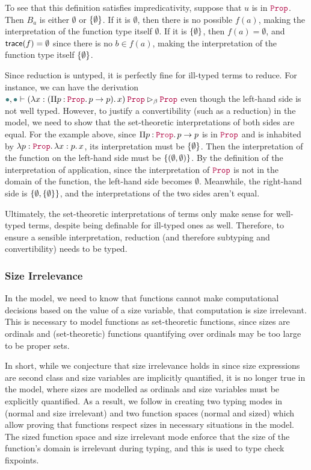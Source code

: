 To see that this definition satisfies impredicativity,
suppose that $u$ is in $\Prop$.
Then $B_a$ is either $\emptyset$ or $\{\emptyset\}$.
If it is $\emptyset$, then there is no possible $f(a)$,
making the interpretation of the function type itself $\emptyset$.
If it is $\{\emptyset\}$, then $f(a) = \emptyset$,
and $\textsf{trace}(f) = \emptyset$ since there is no $b \in f(a)$,
making the interpretation of the function type itself $\{\emptyset\}$.

Since reduction is untyped, it is perfectly fine for ill-typed terms to reduce.
For instance, we can have the derivation
$\mt, \mt \vdash \app{(\abs{x}{(\prod{p}{\Prop}{p \to p})}{x})}{\Prop} \rhd_\beta \Prop$
even though the left-hand side is not well typed.
However, to justify a convertibility (such as a reduction) in the model,
we need to show that the set-theoretic interpretations of both sides are equal.
For the example above, since $\prod{p}{\Prop}{p \to p}$ is in $\Prop$
and is inhabited by $\abs{p}{\Prop}{\abs{x}{p}{x}}$,
its interpretation must be $\{\emptyset\}$.
Then the interpretation of the function on the left-hand side must be $\{(\emptyset, \emptyset)\}$.
By the definition of the interpretation of application,
since the interpretation of $\Prop$ is not in the domain of the function,
the left-hand side becomes $\emptyset$.
Meanwhile, the right-hand side is $\{\emptyset, \{\emptyset\}\}$,
and the interpretations of the two sides aren't equal.

Ultimately, the set-theoretic interpretations of terms only make sense for well-typed terms,
despite being definable for ill-typed ones as well.
Therefore, to ensure a sensible interpretation,
reduction (and therefore subtyping and convertibility) needs to be typed.

\subsubsection{Size Irrelevance}

In the model, we need to know that functions cannot make computational decisions
based on the value of a size variable, \ie that computation is size irrelevant.
This is necessary to model functions as set-theoretic functions, since sizes are
ordinals and (set-theoretic) functions quantifying over ordinals may be too
large to be proper sets.

In short, while we conjecture that size irrelevance holds in \lang since size
expressions are second class and size variables are implicitly quantified, it is
no longer true in the model, where sizes are modelled as ordinals and size
variables must be explicitly quantified.
As a result, we follow \citet{barras-thesis} in creating two typing modes in
\langAnother (normal and size irrelevant) and two function spaces (normal
and sized) which allow proving that functions respect sizes in necessary
situations in the model.
The sized function space and size irrelevant mode enforce that the size of the
function's domain is irrelevant during typing, and this is used to type check
fixpoints.

